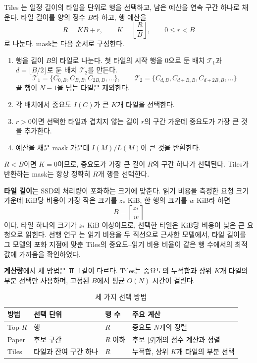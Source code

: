 Tiles \cite{seol2026}는 일정 길이의 타일을 단위로 행을 선택하고, 남은 예산을 연속 구간 하나로 채운다. 타일 길이를 양의 정수 $B$라 하고, 행 예산을
\[
R=KB+r,
\qquad
K=\left\lfloor\frac RB\right\rfloor,
\qquad
0\le r<B
\]
로 나눈다. mask는 다음 순서로 구성한다.

\begin{enumerate}
\item 행을 길이 $B$의 타일로 나눈다. 첫 타일의 시작 행을 $0$으로 둔 배치 $\mathcal T_1$과 $d=\lfloor B/2\rfloor$로 둔 배치 $\mathcal T_2$를 만든다.
\[
\mathcal T_1=\{C_{0,B},C_{B,B},C_{2B,B},\ldots\},
\qquad
\mathcal T_2=\{C_{d,B},C_{d+B,B},C_{d+2B,B},\ldots\}
\]
끝 행이 $N-1$을 넘는 타일은 제외한다.
\item 각 배치에서 중요도 $I(C)$가 큰 $K$개 타일을 선택한다.
\item $r>0$이면 선택한 타일과 겹치지 않는 길이 $r$의 구간 가운데 중요도가 가장 큰 것을 추가한다.
\item 예산을 채운 mask 가운데 $I(M)/L(M)$이 큰 것을 반환한다.
\end{enumerate}

$R<B$이면 $K=0$이므로, 중요도가 가장 큰 길이 $R$의 구간 하나가 선택된다. Tiles가 반환하는 mask는 항상 정확히 $R$개 행을 선택한다.

\textbf{타일 길이}는 SSD의 처리량이 포화하는 크기에 맞춘다. 읽기 비용을 측정한 요청 크기 가운데 KiB당 비용이 가장 작은 크기를 $z_\ast$ KiB, 한 행의 크기를 $w$ KiB라 하면
\[
B=\left\lceil\frac{z_\ast}{w}\right\rceil
\]
이다. 타일 하나의 크기가 $z_\ast$ KiB 이상이므로, 선택한 타일은 KiB당 비용이 낮은 큰 요청으로 읽힌다. 선행 연구 \cite{seol2026}는 읽기 비용을 두 직선으로 근사한 모델에서, 타일 길이를 그 모델의 포화 지점에 맞춘 Tiles의 중요도--읽기 비용 비율이 같은 행 수에서의 최적값에 가까움을 확인하였다.

\textbf{계산량}에서 세 방법은 표~\ref{tab:selectors}\와 같이 다르다. Tiles는 중요도의 누적합과 상위 $K$개 타일의 부분 선택만 사용하며, 고정된 $B$에서 평균 $O(N)$ 시간이 걸린다.

\begin{table}[htbp]
    \centering
    \caption{세 가지 선택 방법}
    \label{tab:selectors}
    \begin{tabular}{llll}
        \toprule
        방법 & 선택 단위 & 행 수 & 주요 계산 \\
        \midrule
        Top-$R$ & 행 & $R$ & 중요도 $N$개의 정렬 \\
        Paper & 후보 구간 & $R$ 이하 & 후보 $|\mathcal G|$개의 점수 계산과 정렬 \\
        Tiles & 타일과 잔여 구간 하나 & $R$ & 누적합, 상위 $K$개 타일의 부분 선택 \\
        \bottomrule
    \end{tabular}
\end{table}

